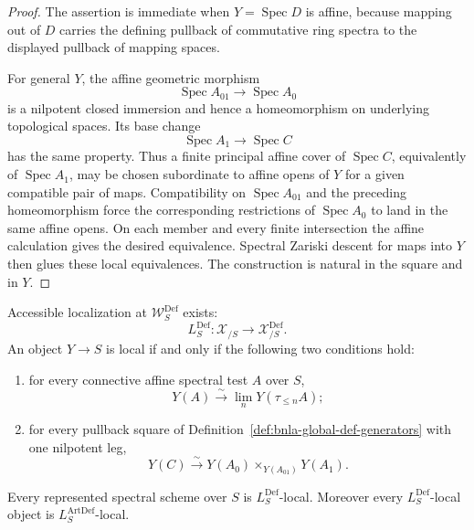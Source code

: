 \begin{proof}
The assertion is immediate when $Y=\operatorname{Spec}D$ is affine, because
mapping out of $D$ carries the defining pullback of commutative ring spectra to
the displayed pullback of mapping spaces.

For general $Y$, the affine geometric morphism
\[
    \operatorname{Spec}A_{01}\longrightarrow\operatorname{Spec}A_0
\]
is a nilpotent closed immersion and hence a homeomorphism on underlying
topological spaces.  Its base change
\[
    \operatorname{Spec}A_1\longrightarrow\operatorname{Spec}C
\]
has the same property.  Thus a finite principal affine cover of
$\operatorname{Spec}C$, equivalently of $\operatorname{Spec}A_1$, may be
chosen subordinate to affine opens of $Y$ for a given compatible pair of
maps.  Compatibility on $\operatorname{Spec}A_{01}$ and the preceding
homeomorphism force the corresponding restrictions of
$\operatorname{Spec}A_0$ to land in the same affine opens.  On each member
and every finite intersection the affine calculation gives the desired
equivalence.  Spectral Zariski descent for maps into $Y$ then glues these
local equivalences.  The construction is natural in the square and in $Y$.
\end{proof}

\begin{theorem}
\label{thm:bnla-global-def-reflector}
Accessible localization at $\mathcal W^{\mathrm{Def}}_S$ exists:
\[
\boxed{
    L^{\mathrm{Def}}_S:
    \mathcal X_{/S}
    \longrightarrow
    \mathcal X^{\mathrm{Def}}_{/S}.}
\]
An object $Y\to S$ is local if and only if the following two conditions hold:
\begin{enumerate}
    \item for every connective affine spectral test $A$ over $S$,
    \[
    \boxed{
        Y(A)
        \xrightarrow{\sim}
        \lim_nY(\tau_{\leq n}A);}
    \]
    \item for every pullback square of
    Definition~\ref{def:bnla-global-def-generators} with one nilpotent leg,
    \[
    \boxed{
        Y(C)
        \xrightarrow{\sim}
        Y(A_0)\times_{Y(A_{01})}Y(A_1).}
    \]
\end{enumerate}
Every represented spectral scheme over $S$ is
$L^{\mathrm{Def}}_S$-local.  Moreover every
$L^{\mathrm{Def}}_S$-local object is
$L^{\mathrm{ArtDef}}_S$-local.
\end{theorem}

